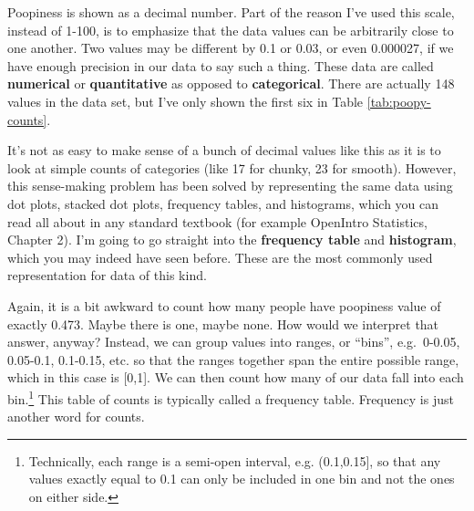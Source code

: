 \documentclass[openany]{book}
\begin{document}
Poopiness is shown as a decimal number. Part of the reason I've used this scale, instead of 1-100, is to emphasize that the data values can be arbitrarily close to one another. Two values may be different by 0.1 or 0.03, or even 0.000027, if we have enough precision in our data to say such a thing. These data are called \textbf{numerical} or \textbf{quantitative} as opposed to \textbf{categorical}. There are actually 148 values in the data set, but I've only shown the first six in Table \ref{tab:poopy-counts}.

It's not as easy to make sense of a bunch of decimal values like this as it is to look at simple counts of categories (like 17 for chunky, 23 for smooth). However, this sense-making problem has been solved by representing the same data using dot plots, stacked dot plots, frequency tables, and histograms, which you can read all about in any standard textbook (for example OpenIntro Statistics, Chapter 2). I'm going to go straight into the \textbf{frequency table} and \textbf{histogram}, which you may indeed have seen before. These are the most commonly used representation for data of this kind.

Again, it is a bit awkward to count how many people have poopiness value of exactly 0.473. Maybe there is one, maybe none. How would we interpret that answer, anyway? Instead, we can group values into ranges, or ``bins'', e.g.~0-0.05, 0.05-0.1, 0.1-0.15, etc. so that the ranges together span the entire possible range, which in this case is {[}0,1{]}. We can then count how many of our data fall into each bin.\footnote{Technically, each range is a semi-open interval, e.g. (0.1,0.15{]}, so that any values exactly equal to 0.1 can only be included in one bin and not the ones on either side.} This table of counts is typically called a frequency table. Frequency is just another word for counts.
\end{document}
